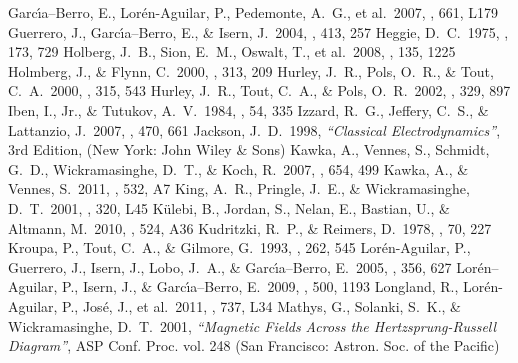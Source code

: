 \documentclass[]{emulateapj}
\begin{document}
\begin{thebibliography}{}
 Garc{\'{\i}}a--Berro, E., Lor{\'e}n-Aguilar, P., Pedemonte, A.~G., et al.\ 2007, \apjl, 661, L179 
 Guerrero, J., Garc{\'{\i}}a--Berro, E., \& Isern, J.\ 2004, \aap, 413, 257
 Heggie, D.~C.\ 1975, \mnras, 173, 729
 Holberg, J.~B., Sion, E.~M., Oswalt, T., et al.\ 2008, \aj, 135, 1225
 Holmberg, J., \& Flynn, C.\ 2000, \mnras, 313, 209 
 Hurley, J.~R., Pols, O.~R., \& Tout, C.~A.\ 2000, \mnras, 315, 543
 Hurley, J.~R., Tout, C.~A., \& Pols, O.~R.\ 2002, \mnras, 329, 897
 Iben, I., Jr., \& Tutukov, A.~V.\ 1984, \apjs, 54, 335
 Izzard, R.~G., Jeffery, C.~S., \& Lattanzio, J.\ 2007, \aap, 470, 661
 Jackson, J.~D.\ 1998, {\sl ``Classical Electrodynamics''}, 3rd Edition, (New York: John Wiley \& Sons)
 Kawka, A., Vennes, S., Schmidt, G.~D., Wickramasinghe, D.~T., \& Koch, R.\ 2007, \apj, 654, 499
 Kawka, A., \& Vennes, S.\ 2011, \aap, 532, A7
 King, A.~R., Pringle, J.~E., \& Wickramasinghe, D.~T.\ 2001, \mnras, 320, L45
 K{\"u}lebi, B., Jordan, S., Nelan, E., Bastian, U., \& Altmann, M.\ 2010, \aap, 524, A36 
 Kudritzki, R.~P., \& Reimers, D.\ 1978, \aap, 70, 227
 Kroupa, P., Tout, C.~A., \& Gilmore, G.\ 1993, \mnras, 262, 545
 Lor{\'e}n-Aguilar, P., Guerrero, J., Isern, J., Lobo, J.~A., \& Garc{\'{\i}}a--Berro, E.\ 2005, \mnras, 356, 627
 Lor{\'e}n--Aguilar, P., Isern, J., \& Garc{\'{\i}}a--Berro, E.\ 2009, \aap, 500, 1193
 Longland, R., Lor{\'e}n-Aguilar, P., Jos{\'e}, J., et al.\ 2011, \apjl, 737, L34
 Mathys, G., Solanki, S.~K., \& Wickramasinghe, D.~T.\ 2001, {\sl ``Magnetic Fields Across the Hertzsprung-Russell Diagram''}, ASP Conf. Proc. vol. 248 (San Francisco: Astron. Soc. of the Pacific)

\end{thebibliography}
\end{document}
